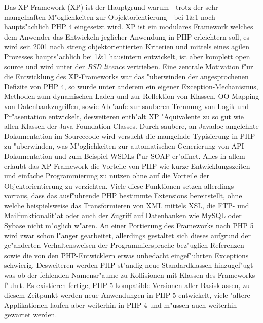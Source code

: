 Das XP-Framework \cite{XPHP} (XP) ist der Hauptgrund warum - trotz der sehr mangelhaften M"oglichkeiten zur 
Objektorientierung - bei 1\&1 noch haupts"achlich PHP 4 eingesetzt wird. XP ist ein modulares Framework welches
dem Anwender das Entwickeln jeglicher Anwendung in PHP erleichtern soll, es wird seit 2001 nach streng 
objektorientierten Kriterien und mittels eines agilen Prozesses haupts"achlich bei 1\&1 hausintern entwickelt,
ist aber komplett open source und wird unter der \emph{BSD licence} \cite{BSDLICENCE} vertrieben.
Eine zentrale Motivation f"ur die Entwicklung des XP-Frameworks war das "uberwinden der angesprochenen
Defizite von PHP 4, so wurde unter anderem ein eigener Exception-Mechanismus, Methoden zum dynamischen
Laden und zur Reflektion von Klassen, OO-Mapping von Datenbankzugriffen, sowie Abl"aufe zur sauberen 
Trennung von Logik und Pr"asentation entwickelt, desweiteren enth"alt XP "Aquivalente zu so gut wie allen Klassen 
der Java Foundation Classes.
Durch saubere, an Javadoc \cite{JAVADOC} angelehnte Dokumentation im Sourcecode wird versucht die mangelnde
Typisierung in PHP zu "uberwinden, was M"oglichkeiten zur automatischen Generierung von API-Dokumentation und zum
Beispiel WSDLs \cite{WSDLSPEC} f"ur SOAP er"offnet.
Alles in allem erlaubt das XP-Framework die Vorteile von PHP wie kurze Entwicklungszeiten und einfache 
Programmierung zu nutzen ohne auf die Vorteile der Objektorientierung zu verzichten.
Viele diese Funktionen setzen allerdings vorraus, dass das ausf"uhrende PHP bestimmte Extensions bereitstellt,
ohne welche beispielsweise das Transformieren von XML mittels XSL, die FTP- und Mailfunktionalit"at oder auch
der Zugriff auf Datenbanken wie MySQL oder Sybase nicht m"oglich w"aren.
An einer Portierung des Frameworks nach PHP 5 wird zwar schon l"anger gearbeitet, allerdings gestaltet sich dieses 
aufgrund der ge"anderten Verhaltensweisen der Programmiersprache bez"uglich Referenzen sowie die von den PHP-Entwicklern
etwas unbedacht eingef"uhrten Exceptions schwierig. Desweiteren werden PHP st"andig neue Standardklassen
hinzugef"ugt was ob der fehlenden Namensr"aume zu Kollisionen mit Klassen des Frameworks f"uhrt.
Es existieren fertige, PHP 5 kompatible Versionen aller Basisklassen, zu diesem Zeitpunkt werden neue Anwendungen 
in PHP 5 entwickelt, viele "altere Applikationen laufen aber weiterhin in PHP 4 und m"ussen auch weiterhin
gewartet werden.



